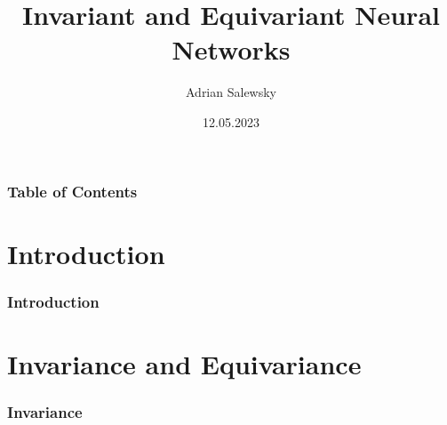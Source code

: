 \documentclass{beamer}
\title{Invariant and Equivariant Neural Networks}
\author[Adrian Salewsky]{Adrian Salewsky}
\institute{Technische Universität Berlin}
\date{12.05.2023}
\begin{document}
\frame{\titlepage}

\begin{frame}
\frametitle{Table of Contents}
\tableofcontents
\end{frame}

\section{Introduction} 
\begin{frame}
\frametitle{Introduction}
\begin{figure}[h]
\end{figure}
\end{frame}

\section{Invariance and Equivariance}
\begin{frame}
\frametitle{Invariance}
\begin{figure}[h]
\end{figure}
\end{frame}
\end{document}

